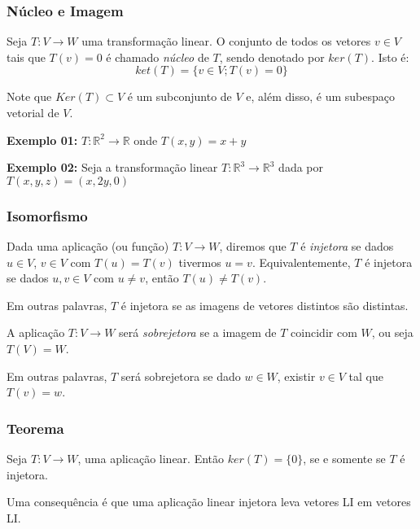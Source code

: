 \documentclass[hyperref={pdfpagelabels=false}]{beamer}
\begin{document}
\begin{frame}
\frametitle{Núcleo e Imagem}
\begin{definition}
	Seja $T:V \rightarrow W$ uma transformação linear. O conjunto de todos os vetores $v \in V$ tais que $T(v) = 0$ é chamado \emph{núcleo} de $T$, sendo denotado por $ker(T)$. Isto é:
	$$ket(T) = \{ v \in V; T(v) = 0 \}$$
	
	Note que $Ker(T) \subset V$ é um subconjunto de $V$ e, além disso, é um subespaço vetorial de $V$.
\end{definition}

{\bf Exemplo 01:} $T: \mathbb{R}^2 \rightarrow \mathbb{R}$ onde $T(x,y) = x + y$

{\bf Exemplo 02:} Seja a transformação linear $T: \mathbb{R}^3 \rightarrow \mathbb{R}^3$ dada por $T(x,y,z) = (x,2y,0)$
\end{frame}

\begin{frame}
\frametitle{Isomorfismo}

\begin{definition}
	Dada uma aplicação (ou função) $T: V \rightarrow W$, diremos que $T$ é \emph{injetora} se dados $u \in V$, $v \in V$ com $T(u) = T(v)$ tivermos $u = v$. Equivalentemente, $T$ é injetora se dados $u,v \in V$ com $u \neq v$, então $T(u) \neq T(v)$.
	
	Em outras palavras, $T$ é injetora se as imagens de vetores distintos são distintas.
\end{definition}

\pause

\begin{definition}
	A aplicação $T: V \rightarrow W$ será \emph{sobrejetora} se a imagem de $T$ coincidir com $W$, ou seja $T(V) = W$.
	
	Em outras palavras, $T$ será sobrejetora se dado $w \in W$, existir $v \in V$ tal que $T(v) = w$.

\end{definition}


\end{frame}

\begin{frame}
\frametitle{Teorema}

\begin{theorem}
	Seja $T: V \rightarrow W$, uma aplicação linear. Então $ker(T) = \{0\}$, se e somente se $T$ é injetora.
\end{theorem}

\pause

Uma consequência é que uma aplicação linear injetora leva vetores LI em vetores LI.

\end{frame}
\end{document}
